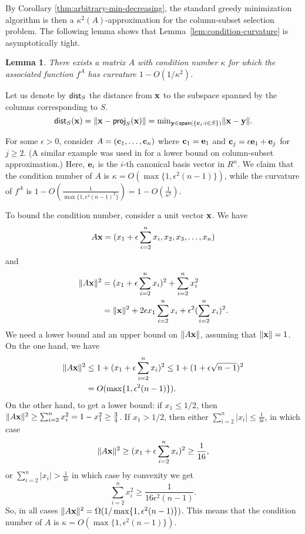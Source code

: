 \documentclass{article}
\newtheorem{lemma}[theorem]{Lemma}
\theoremstyle{definition}
\begin{document}
By Corollary \ref{thm:arbitrary-min-decreasing}, the standard greedy minimization algorithm is then a $\kappa^2(A)$-approximation for the column-subset selection problem.
The following lemma shows that Lemma~\ref{lem:condition-curvature} is asymptotically tight.

\begin{lemma}
There exists a matrix $A$ with condition number $\kappa$ for which the associated function $f^{A}$ has curvature $1 - O(1/\kappa^{2})$.
\end{lemma}

Let us denote by $\mathsf{dist}_S$ the distance from $\mathbf x$ to the subspace spanned by the columns corresponding to $S$.
$$ \mathsf{dist}_S(\mathbf x) = \|\mathbf x - \mathsf{proj}_S(\mathbf x)\| = \mbox{min}_{\mathbf y \in \mathsf{span}(\{\mathbf c_i: i \in S\})} \|\mathbf x - \mathbf y\|.$$



For some $\epsilon>0$, consider $A = (\mathbf c_1, \ldots, \mathbf c_n)$ where $\mathbf c_1 = \mathbf e_1$ and $\mathbf c_j = \epsilon \mathbf e_1 + \mathbf e_j$ for $j \geq 2$.
(A similar example was used in \cite{Boutsidis2014} for a lower bound on column-subset approximation.) Here, $\mathbf e_i$ is the $i$-th canonical basis vector in $R^n$. We claim that the condition number of $A$ is $\kappa = O(\max \{1, \epsilon^2 (n-1) \})$, while the curvature of $f^A$ is $1 - O(\frac{1}{\max \{1, \epsilon^4 (n-1)^2 \}}) = 1 - O(\frac{1}{\kappa^2})$.

To bound the condition number, consider a unit vector $\mathbf x$. We have
$$ A \mathbf x = (x_1 + \epsilon \sum_{i=2}^{n} x_i, x_2, x_3, \ldots, x_n) $$
and
\begin{align*} \|A \mathbf x \|^2 &= (x_1 + \epsilon \sum_{i=2}^{n} x_i)^2 + \sum_{i=2}^{n} x_i^2 \\ &= \| \mathbf x \|^2 + 2 \epsilon x_1 \sum_{i=2}^{n} x_i + \epsilon^2 (\sum_{i=2}^{n} x_i)^2.
\end{align*}
We need a lower bound and an upper bound on $\|A \mathbf x \|$, assuming that $\| \mathbf x\| = 1$. On the one hand, we have
\begin{align*}
\| A \mathbf x \|^2 &\leq 1 + (x_1 + \epsilon \sum_{i=2}^{n} x_i)^2 \leq 1 + (1 + \epsilon \sqrt{n-1})^2 \\
&= O( \max \{1, \epsilon^2 (n-1) \}).
\end{align*}
On the other hand, to get a lower bound: if $x_1 \leq 1/2$, then $\| A \mathbf x \|^2 \geq \sum_{i=2}^{n} x_i^2 = 1 - x_1^2 \geq \frac34$. If $x_1 > 1/2$, then either $\sum_{i=2}^{n} |x_i| \leq \frac{1}{4 \epsilon}$, in which case $$\| A \mathbf x \|^2 \geq (x_1 + \epsilon \sum_{i=2}^{n} x_i)^2 \geq \frac{1}{16},$$ or $\sum_{i=2}^{n} |x_i| > \frac{1}{4 \epsilon}$ in which case by convexity we get $$\sum_{i=2}^{n} x_i^2 \geq \frac{1}{16 \epsilon^2 (n-1)}.$$ So, in all cases $\| A \mathbf x \|^2 = \Omega(1 / \max \{1,\epsilon^2 (n-1)\})$. This means that the condition number of $A$ is $\kappa = O(\max \{1, \epsilon^2(n-1) \})$.
\end{document}
